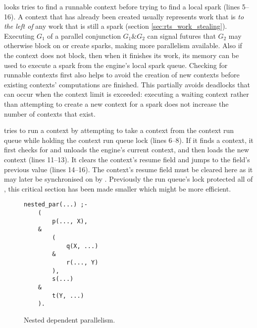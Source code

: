 \idle looks tries to find a runnable context before trying to find a local
spark (lines 5--16).
A context that has already been created usually represents work that is
\emph{to the left of}
any work that is still a spark (section \ref{sec:rts_work_stealing}).
Executing $G_1$ of a parallel conjunction $G_1 \& G_2$ can signal futures
that $G_2$ may otherwise block on or create sparks,
making more parallelism available.
Also if the context does not block, then when it finishes its work,
its memory can be used to execute a spark from the engine's local spark queue.
Checking for runnable contexts first also helps to avoid the creation of new
contexts before existing contexts' computations are finished.
This partially avoids deadlocks that can occur when the context limit is
exceeded:
executing a waiting context rather than attempting to create a new context
for a spark does not increase the number of contexts that exist.

\idle tries to run a context by attempting to take a context from the
context run queue while holding the context run queue lock (lines 6--8).
If it finds a context,
it first checks for and unloads the engine's current context,
and then loads the new context (lines 11--13).
It clears the context's resume field and jumps to the field's previous value
(lines 14--16).
The context's resume field must be cleared here as it may later be
synchronised on by \joinandcontinue.
Previously the run queue's lock protected all of \idle,
this critical section has been made smaller which might be more efficient.

\begin{figure}
\begin{center}
\begin{verbatim}
nested_par(...) ;-
    (
        p(..., X),
    &
        (
            q(X, ...)
        & 
            r(..., Y)
        ),
        s(...)
    &
        t(Y, ...)
    ).
\end{verbatim}
\end{center}
\caption{Nested dependent parallelism.}
\label{fig:nested_dep_par}
\end{figure}

